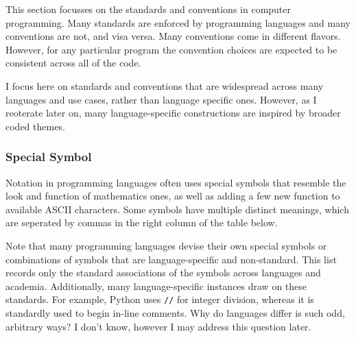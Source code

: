 \documentclass{article}
\newcommand{\code}[1]{\texttt{#1}}
\begin{document}
	This section focusses on the standards and conventions in computer programming. Many standards are enforced by programming languages and many conventions are not, and visa versa. Many conventions come in different flavors. However, for any particular program the convention choices are expected to be consistent across all of the code.

	I focus here on standards and conventions that are widespread across many languages and use cases, rather than language specific ones. However, as I reoterate later on, many language-specific constructions are inspired by broader coded themes.

\subsubsection{Special Symbol}
	Notation in programming languages often uses special symbols that resemble the look and function of mathematics ones, as well as adding a few new function to available ASCII characters. Some symbols have multiple distinct meanings, which are seperated by commas in the right column of the table below.

	Note that many programming languages devise their own special symbols or combinations of symbols that are language-specific and non-standard. This list records only the standard associations of the symbols across languages and academia. Additionally, many language-specific instances draw on these standards. For example, Python uses \code{//} for integer division, whereas it is standardly used to begin in-line comments. Why do languages differ is such odd, arbitrary ways? I don't know, however I may address this question later.

	\vspace{20px}
	
\end{document}
